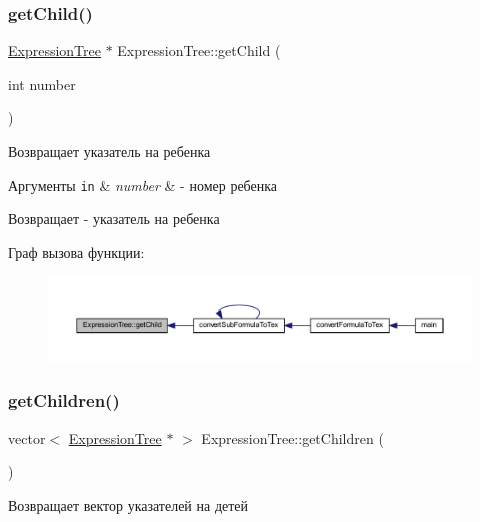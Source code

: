 \subsubsection{\texorpdfstring{get\+Child()}{getChild()}}
{\footnotesize\ttfamily \mbox{\hyperlink{class_expression_tree}{Expression\+Tree}} $\ast$ Expression\+Tree\+::get\+Child (\begin{DoxyParamCaption}\item[{int}]{number }\end{DoxyParamCaption})}



Возвращает указатель на ребенка 


\begin{DoxyParams}[1]{Аргументы}
\mbox{\tt in}  & {\em number} & -\/ номер ребенка \\
\hline
\end{DoxyParams}
\begin{DoxyReturn}{Возвращает}
-\/ указатель на ребенка 
\end{DoxyReturn}
Граф вызова функции\+:\nopagebreak
\begin{figure}[H]
\begin{center}
\leavevmode
\includegraphics[width=350pt]{class_expression_tree_a43f4d0121efe31c0258e5932007b928e_icgraph}
\end{center}
\end{figure}
\mbox{\label{class_expression_tree_ac9cd919de3aa4392384d35ab3c59d6d0}} 
\subsubsection{\texorpdfstring{get\+Children()}{getChildren()}}
{\footnotesize\ttfamily vector$<$ \mbox{\hyperlink{class_expression_tree}{Expression\+Tree}} $\ast$ $>$ Expression\+Tree\+::get\+Children (\begin{DoxyParamCaption}{ }\end{DoxyParamCaption})}



Возвращает вектор указателей на детей 


